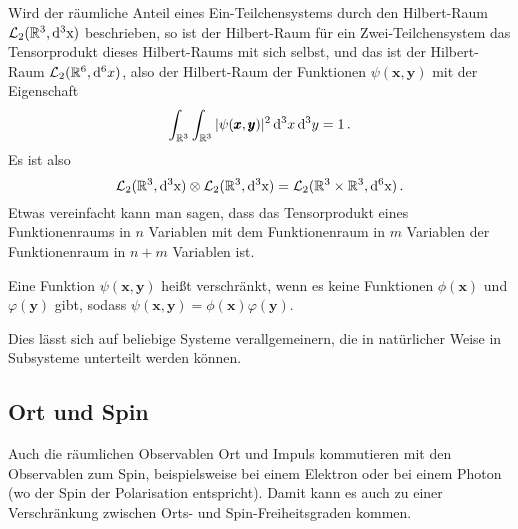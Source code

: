 Wird der r\"aumliche Anteil eines Ein-Teilchensystems durch den Hilbert-Raum
${\cal L}_2(\mathbb{R}^3,{\rm d^3 x)}$ beschrieben, so ist der Hilbert-Raum f\"ur ein
Zwei-Teilchensystem das Tensorprodukt dieses Hilbert-Raums mit sich selbst, 
und das ist der Hilbert-Raum ${\cal L}_2(\mathbb{R}^6,{\rm d}^6 x)$, also der
Hilbert-Raum der Funktionen $\psi(\pmb{x},\pmb{y})$ mit der Eigenschaft
\begin{equation}
       \int_{\mathbb{R}^3} \int_{\mathbb{R}^3} | \psi(\pmb{x},\pmb{y}) |^2 \, {\rm d}^3x \,{\rm d}^3y = 1 \, .
\end{equation}
Es ist also
\begin{equation}
          {\cal L}_2(\mathbb{R}^3,{\rm d^3 x)} \otimes {\cal L}_2(\mathbb{R}^3,{\rm d^3 x)} =
          {\cal L}_2(\mathbb{R}^3\times \mathbb{R}^3,{\rm d^6 x)} \, .
\end{equation}
Etwas vereinfacht kann man sagen, dass das Tensorprodukt eines Funktionenraums in $n$
Variablen mit dem Funktionenraum in $m$ Variablen der Funktionenraum in $n+m$ Variablen
ist. 

Eine Funktion $\psi(\pmb{x},\pmb{y})$ hei\ss t verschr\"ankt, wenn es keine Funktionen 
$\phi(\pmb{x})$ und $\varphi(\pmb{y})$ gibt, sodass $\psi(\pmb{x},\pmb{y})=\phi(\pmb{x}) \varphi(\pmb{y})$.

Dies l\"asst sich auf beliebige Systeme verallgemeinern, die in nat\"urlicher Weise in Subsysteme
unterteilt werden k\"onnen. 

\subsection{Ort und Spin}

Auch die r\"aumlichen Observablen Ort und Impuls kommutieren mit den Observablen zum 
Spin, beispielsweise bei einem Elektron oder bei einem Photon (wo der Spin
der Polarisation entspricht). Damit kann es auch zu einer Verschr\"ankung zwischen
Orts- und Spin-Freiheitsgraden kommen. 

